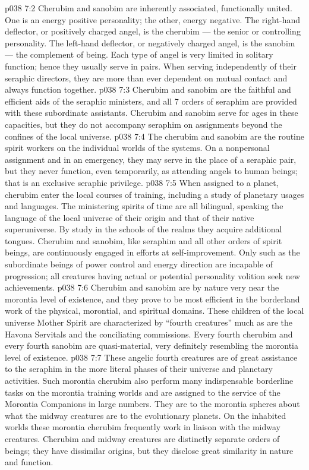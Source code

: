 \vs p038 7:2 Cherubim and sanobim are inherently associated, functionally united. One is an energy positive personality; the other, energy negative. The right\hyp{}hand deflector, or positively charged angel, is the cherubim --- the senior or controlling personality. The left\hyp{}hand deflector, or negatively charged angel, is the sanobim --- the complement of being. Each type of angel is very limited in solitary function; hence they usually serve in pairs. When serving independently of their seraphic directors, they are more than ever dependent on mutual contact and always function together.
\vs p038 7:3 \pc Cherubim and sanobim are the faithful and efficient aids of the seraphic ministers, and all 7 orders of seraphim are provided with these subordinate assistants. Cherubim and sanobim serve for ages in these capacities, but they do not accompany seraphim on assignments beyond the confines of the local universe.
\vs p038 7:4 The cherubim and sanobim are the routine spirit workers on the individual worlds of the systems. On a nonpersonal assignment and in an emergency, they may serve in the place of a seraphic pair, but they never function, even temporarily, as attending angels to human beings; that is an exclusive seraphic privilege.
\vs p038 7:5 \pc When assigned to a planet, cherubim enter the local courses of training, including a study of planetary usages and languages. The ministering spirits of time are all bilingual, speaking the language of the local universe of their origin and that of their native superuniverse. By study in the schools of the realms they acquire additional tongues. Cherubim and sanobim, like seraphim and all other orders of spirit beings, are continuously engaged in efforts at self\hyp{}improvement. Only such as the subordinate beings of power control and energy direction are incapable of progression; all creatures having actual or potential personality volition seek new achievements.
\vs p038 7:6 \pc Cherubim and sanobim are by nature very near the morontia level of existence, and they prove to be most efficient in the borderland work of the physical, morontial, and spiritual domains. These children of the local universe Mother Spirit are characterized by “fourth creatures” much as are the Havona Servitals and the conciliating commissions. Every fourth cherubim and every fourth sanobim are quasi\hyp{}material, very definitely resembling the morontia level of existence.
\vs p038 7:7 These angelic fourth creatures are of great assistance to the seraphim in the more literal phases of their universe and planetary activities. Such morontia cherubim also perform many indispensable borderline tasks on the morontia training worlds and are assigned to the service of the Morontia Companions in large numbers. They are to the morontia spheres about what the midway creatures are to the evolutionary planets. On the inhabited worlds these morontia cherubim frequently work in liaison with the midway creatures. Cherubim and midway creatures are distinctly separate orders of beings; they have dissimilar origins, but they disclose great similarity in nature and function.
